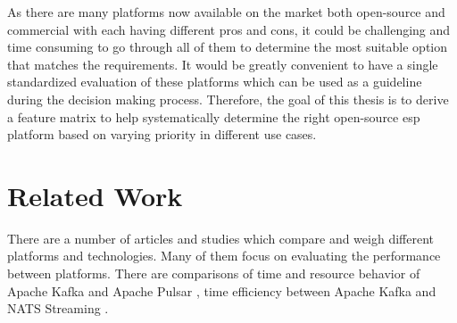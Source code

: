 As there are many platforms now available on the market both open-source and commercial with each having different pros and cons, it could be challenging and time consuming to go through all of them to determine the most suitable option that matches the requirements. It would be greatly convenient to have a single standardized evaluation of these platforms which can be used as a guideline during the decision making process. Therefore, the goal of this thesis is to derive a feature matrix to help systematically determine the right open-source \acrlong{esp} platform based on varying priority in different use cases. 



\section{Related Work}
There are a number of articles and studies which compare and weigh different platforms and technologies. Many of them focus on evaluating the performance between platforms. There are comparisons of time and resource behavior of Apache Kafka and Apache Pulsar \cite{intorruk2019comparative} \cite{benchmarkkafkapulsar}, time efficiency between Apache Kafka and NATS Streaming \cite{benchmarknatskafka}.

